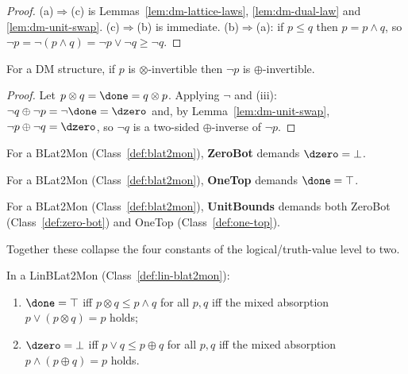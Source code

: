 \begin{proof}
\leanok
(a)$\Rightarrow$(c) is Lemmas~\ref{lem:dm-lattice-laws},
\ref{lem:dm-dual-law} and \ref{lem:dm-unit-swap}. (c)$\Rightarrow$(b)
is immediate. (b)$\Rightarrow$(a): if $p \le q$ then $p = p \wedge q$,
so $\neg p = \neg(p \wedge q) = \neg p \vee \neg q \ge \neg q$.
\end{proof}

\begin{lemma}
\label{lem:dm-maps-units}
\leanok
For a DM structure, if $p$ is $\otimes$-invertible then $\neg p$ is
$\oplus$-invertible.
\end{lemma}

\begin{proof}
\leanok
Let $p \otimes q = \done = q \otimes p$. Applying $\neg$ and (iii):
$\neg q \oplus \neg p = \neg\done = \dzero$ and, by
Lemma~\ref{lem:dm-unit-swap}, $\neg p \oplus \neg q = \dzero$, so
$\neg q$ is a two-sided $\oplus$-inverse of $\neg p$.
\end{proof}

\begin{class}[ZeroBot]
\label{def:zero-bot}
\leanok
For a BLat2Mon (Class~\ref{def:blat2mon}), \textbf{ZeroBot}
demands $\dzero = \bot$.
\end{class}

\begin{class}[OneTop]
\label{def:one-top}
\leanok
For a BLat2Mon (Class~\ref{def:blat2mon}), \textbf{OneTop}
demands $\done = \top$.
\end{class}

\begin{class}[UnitBounds]
\label{def:unit-bounds}
\leanok
For a BLat2Mon (Class~\ref{def:blat2mon}), \textbf{UnitBounds}
demands both ZeroBot (Class~\ref{def:zero-bot}) and OneTop
(Class~\ref{def:one-top}).
\end{class}

Together these collapse the four constants of the logical/truth-value
level to two.

\begin{lemma}
\label{lem:dualabsorb-decomposition}
\leanok
In a LinBLat2Mon (Class~\ref{def:lin-blat2mon}):
\begin{enumerate}
\item[(i)] $\done = \top$ iff $p \otimes q \le p \wedge q$ for all
  $p,q$ iff the mixed absorption $p \vee (p \otimes q) = p$ holds;
\item[(ii)] $\dzero = \bot$ iff $p \vee q \le p \oplus q$ for all $p,q$
  iff the mixed absorption $p \wedge (p \oplus q) = p$ holds.
\end{enumerate}
\end{lemma}

